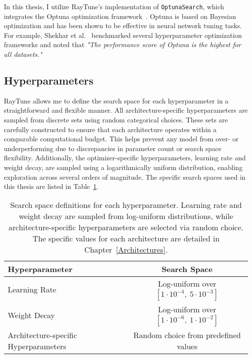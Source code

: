 In this thesis, I utilize RayTune's implementation of \texttt{OptunaSearch}, which integrates the Optuna optimization framework~\cite{akiba2019optuna}. Optuna is based on Bayesian optimization and has been shown to be effective in neural network tuning tasks. For example, Shekhar et al.~\cite{shekhar2021comparative} benchmarked several hyperparameter optimization frameworks and noted that \textit{"The performance score of Optuna is the highest for all datasets."}

\subsection{Hyperparameters}

RayTune allows me to define the search space for each hyperparameter in a straightforward and flexible manner. All architecture-specific hyperparameters are sampled from discrete sets using random categorical choices. These sets are carefully constructed to ensure that each architecture operates within a comparable computational budget. This helps prevent any model from over- or underperforming due to discrepancies in parameter count or search space flexibility. Additionally, the optimizer-specific hyperparameters, learning rate and weight decay, are sampled using a logarithmically uniform distribution, enabling exploration across several orders of magnitude. The specific search spaces used in this thesis are listed in Table~\ref{MethodHyperparams}.

\begin{table}[H]
    \centering
    \begin{tabular}{l|c}
        Hyperparameter & Search Space       \\
        \hline
        Learning Rate      & Log-uniform over $[1 \cdot 10^{-4},\ 5 \cdot 10^{-3}]$ \\
        Weight Decay     & Log-uniform over $[1 \cdot 10^{-6},\ 1 \cdot 10^{-2}]$ \\
        Architecture-specific Hyperparameters      & Random choice from predefined values \\
    \end{tabular}
    \caption{Search space definitions for each hyperparameter. Learning rate and weight decay are sampled from log-uniform distributions, while architecture-specific hyperparameters are selected via random choice. The specific values for each architecture are detailed in Chapter~\ref{Architectures}.}
    \label{MethodHyperparams}
\end{table}